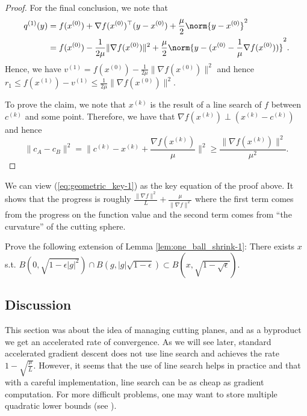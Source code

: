 \begin{proof}
For the final conclusion, we note that
\begin{align*}
q^{(1)}(y) & =f(x^{(0)})+\nabla f(x^{(0)})^{\top}(y-x^{(0)})+\frac{\mu}{2}\norm{y-x^{(0)}}^{2}\\
 & =f(x^{(0)})-\frac{1}{2\mu}\|\nabla f(x^{(0)})\|^{2}+\frac{\mu}{2}\norm{y-(x^{(0)}-\frac{1}{\mu}\nabla f(x^{(0)}))}^{2}.
\end{align*}
Hence, we have $v^{(1)}=f(x^{(0)})-\frac{1}{2\mu}\|\nabla f(x^{(0)})\|^{2}$
and hence $r_{1}\leq f(x^{(1)})-v^{(1)}\leq\frac{1}{2\mu}\|\nabla f(x^{(0)})\|^{2}$.

To prove the claim, we note that $x^{(k)}$ is the result of a line
search of $f$ between $c^{(k)}$ and some point. Therefore, we have
that $\nabla f(x^{(k)})\perp(x^{(k)}-c^{(k)})$ and hence
\[
\|c_{A}-c_{B}\|^{2}=\|c^{(k)}-x^{(k)}+\frac{\nabla f(x^{(k)})}{\mu}\|^{2}\geq\frac{\|\nabla f(x^{(k)})\|^{2}}{\mu^{2}}.
\]
\end{proof}
\begin{rem}
We can view (\ref{eq:geometric_key-1}) as the key equation of the
proof above. It shows that the progress is roughly $\frac{\|\nabla f\|^{2}}{L}+\frac{\mu}{\|\nabla f\|^{2}}$
where the first term comes from the progress on the function value
and the second term comes from ``the curvature'' of the cutting
sphere.
\end{rem}

\begin{xca}
Prove the following extension of Lemma \ref{lem:one_ball_shrink-1}:
There exists $x$ s.t. $B(0,\sqrt{1-\epsilon|g|^{2}})\cap B(g,|g|\sqrt{1-\epsilon})\subset B(x,\sqrt{1-\sqrt{\epsilon}})$.
\end{xca}


\subsection{Discussion}

This section was about the idea of managing cutting planes, and as
a byproduct we get an accelerated rate of convergence. As we will
see later, standard accelerated gradient descent does not use line
search and achieves the rate $1-\sqrt{\frac{\mu}{L}}$. However, it
seems that the use of line search helps in practice and that with
a careful implementation, line search can be as cheap as gradient
computation. For more difficult problems, one may want to store multiple
quadratic lower bounds (see \cite{drusvyatskiy2016optimal}).
